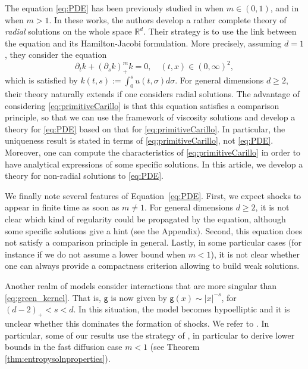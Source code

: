 \documentclass[11pt]{article}
\numberwithin{equation}{section} %
\newcommand{\p}{{\partial}}
\newcommand{\R}{{\mathbb{R}}}
\newcommand{\g}{{\mathsf{g}}}
\begin{document}
The equation \eqref{eq:PDE} has been previously studied in \cite{CGV22FastRegularisation} when $m\in (0,1)$, and in \cite{CGV2022vortex} when $m>1$. In these works, the authors develop a rather complete theory of \emph{radial} solutions on the whole space $\R^d$. Their strategy is to use the link between the equation and its Hamilton-Jacobi formulation. More precisely, assuming $d=1$, they consider the equation
\begin{equation}\label{eq:primitiveCarillo}
    \p_t k + (\p_s k)_+^m k = 0, \quad (t,x) \in (0,\infty)^2,
\end{equation}
which is satisfied by $\displaystyle k(t,s) := \int_0^s u(t,\sigma)d\sigma$. For general dimensions $d\ge 2$, their theory naturally extends if one considers radial solutions. The advantage of considering \eqref{eq:primitiveCarillo} is that this equation satisfies a comparison principle, so that we can use the framework of viscosity solutions and develop a theory for \eqref{eq:PDE} based on that for \eqref{eq:primitiveCarillo}. In particular, the uniqueness result is stated in terms of \eqref{eq:primitiveCarillo}, not \eqref{eq:PDE}. Moreover, one can compute the characteristics of \eqref{eq:primitiveCarillo} in order to have analytical expressions of some specific solutions. In this article, we develop a theory for non-radial solutions to \eqref{eq:PDE}. 

We finally note several features of Equation~\eqref{eq:PDE}. First, we expect shocks to appear in finite time as soon as $m\ne 1$. For general dimensions $d\ge 2$, it is not clear which kind of regularity could be propagated by the equation, although some specific solutions give a hint (see the Appendix). Second, this equation does not satisfy a comparison principle in general. Lastly, in some particular cases (for instance if we do not assume a lower bound when $m<1$), it is not clear whether one can always provide a compactness criterion allowing to build weak solutions.  

Another realm of models consider interactions that are more singular than \eqref{eq:green_kernel}. That is, $\g$ is now given by $\g(x) \sim  |x|^{-s}$, for $(d-2)_+< s< d$. In this situation, the model becomes hypoelliptic and it is unclear whether this dominates the formation of shocks. We refer to \cite{stanTesoVazquez2019existence, STAN2016infinitespeed, nguyen2018porous, ACDC25}. In particular, some of our results use the strategy of \cite{ACDC25}, in particular to derive lower bounds in the fast diffusion case $m<1$ (see Theorem \ref{thm:entropysolnproperties}).
\end{document}
